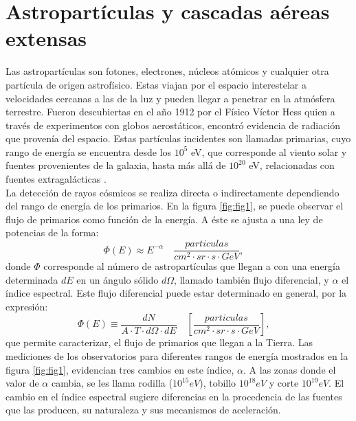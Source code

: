 \newpage
\chapter{Astropartículas y cascadas aéreas extensas}

\noindent Las astropartículas son fotones, electrones, núcleos atómicos y cualquier otra partícula de origen astrofísico. Estas viajan por el espacio interestelar a velocidades cercanas a las de la luz y pueden llegar a penetrar en la atmósfera terrestre. Fueron descubiertas en el año 1912 por el Físico Víctor Hess quien a través de experimentos con globos aerostáticos, encontró evidencia de radiación que provenía del espacio. Estas partículas incidentes son llamadas primarias, cuyo rango de energía se encuentra desde los $10^5$ eV, que corresponde al  viento solar y fuentes provenientes de la galaxia, hasta m\'as all\'a de $10^{20}$ eV, relacionadas con fuentes extragalácticas \parencite{augerextra}. \\

La detección de rayos cósmicos se realiza directa o indirectamente dependiendo del rango de energía de los primarios. En la figura \ref{fig:fig1}, se puede observar el flujo de primarios como función de la energía. A éste se ajusta a una ley de potencias de la forma:%
\begin{equation}
\Phi (E) \approx E^{-\alpha}\quad \frac{particulas}{cm^{2} \cdot sr \cdot s \cdot GeV}, \quad
\label{eq:eq1}
\end{equation}
donde $\Phi$ corresponde al número de astropartículas que llegan a con una energía determinada $dE$ en un ángulo sólido $d\Omega$, llamado también flujo diferencial, y $\alpha$ el índice espectral. Este flujo diferencial puede estar determinado en general, por la expresión:
\begin{equation}
    \Phi (E) \equiv \frac{dN}{A \cdot T \cdot d\Omega \cdot dE} \quad \left[\frac{particulas}{cm^{2} \cdot sr \cdot s \cdot GeV} \right], \quad
\end{equation}
que permite caracterizar, el flujo de primarios que llegan a la Tierra. Las mediciones de los observatorios para diferentes rangos de energía mostrados en la figura \ref{fig:fig1}, evidencian tres cambios en este índice, $\alpha$. A las zonas donde el valor de $\alpha$ cambia, se les llama rodilla ($10^{15}eV$), tobillo $10^{18}eV$ y corte $10^{19}eV$.  \parencite{PDG} El cambio en el índice espectral sugiere diferencias en la procedencia de las fuentes que las producen, su naturaleza y sus mecanismos de aceleración.\\

